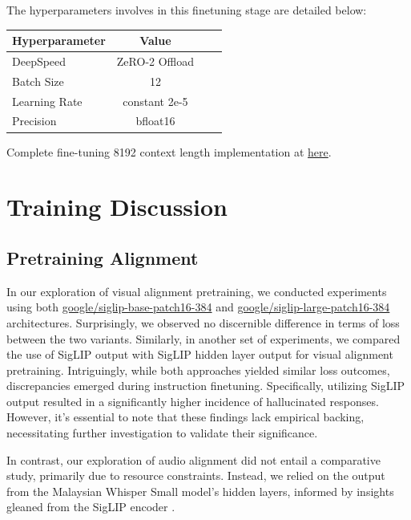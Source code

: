 \documentclass[preprint]{article}
\begin{document}
The hyperparameters involves in this finetuning stage are detailed below:

\begin{table}[h]
  \centering
  \begin{tabular}{lccl}
    \hline
    \textbf{Hyperparameter} & \textbf{Value} \\
    \hline
    DeepSpeed               & ZeRO-2 Offload \\
    Batch Size              & 12             \\
    Learning Rate           & constant 2e-5  \\
    Precision               & bfloat16       \\
    \hline
  \end{tabular}
\end{table}

Complete fine-tuning 8192 context length implementation at \href{https://github.com/mesolitica/multimodal-LLM/blob/master/run-deepspeed.sh}{here}.

\section{Training Discussion}

\subsection{Pretraining Alignment}

In our exploration of visual alignment pretraining, we conducted experiments using both \href{https://huggingface.co/google/siglip-base-patch16-384}{google/siglip-base-patch16-384} and \href{https://huggingface.co/google/siglip-large-patch16-384}{google/siglip-large-patch16-384} architectures. Surprisingly, we observed no discernible difference in terms of loss between the two variants. Similarly, in another set of experiments, we compared the use of SigLIP \cite{zhai2023sigmoid} output with SigLIP \cite{zhai2023sigmoid} hidden layer output for visual alignment pretraining. Intriguingly, while both approaches yielded similar loss outcomes, discrepancies emerged during instruction finetuning. Specifically, utilizing SigLIP \cite{zhai2023sigmoid} output resulted in a significantly higher incidence of hallucinated responses. However, it's essential to note that these findings lack empirical backing, necessitating further investigation to validate their significance.

In contrast, our exploration of audio alignment did not entail a comparative study, primarily due to resource constraints. Instead, we relied on the output from the Malaysian Whisper Small model's hidden layers, informed by insights gleaned from the SigLIP encoder \cite{zhai2023sigmoid}.
\end{document}
